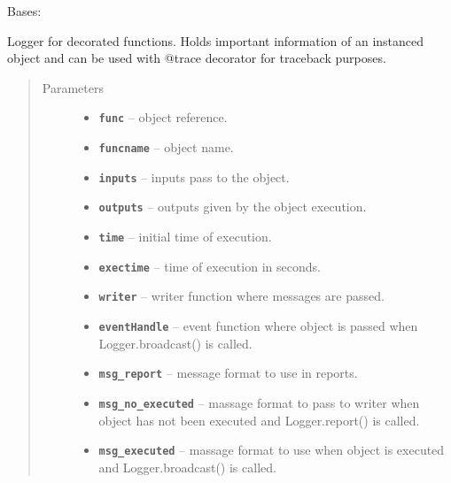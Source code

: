 \documentclass[letterpaper,10pt,english]{sphinxmanual}
\begin{document}
\begin{fulllineitems}
\label{RRtoolbox.lib:RRtoolbox.lib.inspector.Logger}
Bases: 

Logger for decorated functions. Holds important information of an instanced object and
can be used with @trace decorator for traceback purposes.
\begin{quote}\begin{description}
\item[{Parameters}] \leavevmode\begin{itemize}
\item {} 
\textbf{\texttt{func}} -- object reference.

\item {} 
\textbf{\texttt{funcname}} -- object name.

\item {} 
\textbf{\texttt{inputs}} -- inputs pass to the object.

\item {} 
\textbf{\texttt{outputs}} -- outputs given by the object execution.

\item {} 
\textbf{\texttt{time}} -- initial time of execution.

\item {} 
\textbf{\texttt{exectime}} -- time of execution in seconds.

\item {} 
\textbf{\texttt{writer}} -- writer function where messages are passed.

\item {} 
\textbf{\texttt{eventHandle}} -- event function where object is
passed when Logger.broadcast() is called.

\item {} 
\textbf{\texttt{msg\_report}} -- message format to use in reports.

\item {} 
\textbf{\texttt{msg\_no\_executed}} -- massage format to pass to writer when object
has not been executed and Logger.report() is called.

\item {} 
\textbf{\texttt{msg\_executed}} -- massage format to use when object is
executed and Logger.broadcast() is called.

\end{itemize}

\end{description}\end{quote}


\end{fulllineitems}
\end{document}
